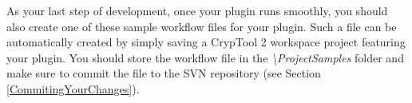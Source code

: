 As your last step of development, once your plugin runs smoothly, you should also create one of these sample workflow files for your plugin. Such a file can be automatically created by simply saving a CrypTool 2 workspace project featuring your plugin. You should store the workflow file in the \textit{\textbackslash ProjectSamples} folder and make sure to commit the file to the SVN repository (see Section \ref{CommitingYourChanges}).